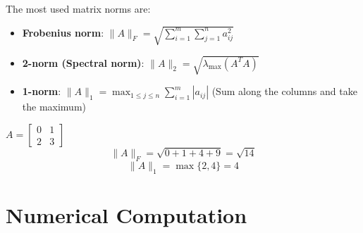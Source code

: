 \documentclass{article}
\begin{document}
The most used matrix norms are:
\begin{itemize}
    \item \textbf{Frobenius norm}: $\lVert
        A\rVert_F=\sqrt{\sum_{i=1}^{m}\sum_{j=1}^{n}a_{ij}^2}$
    \item \textbf{2-norm (Spectral norm)}: $\lVert A\rVert_2=\sqrt{\lambda_{\max}(A^TA)}$
    \item \textbf{1-norm}: $\lVert A\rVert_1=\max_{1\leq j\leq
        n}\sum_{i=1}^{m}\left\lvert a_{ij}\right\rvert$ (Sum along the columns
        and take the maximum)
\end{itemize}
\begin{example}
   $A=\begin{bmatrix}
       0 & 1 \\ 
       2 & 3
   \end{bmatrix}$ 
   $$\lVert A\rVert_F=\sqrt{0+1+4+9}=\sqrt{14}$$
   $$\lVert A\rVert_1=\max\{2,4\}=4$$
\end{example}
\cleardoublepage
\section{Numerical Computation}
\end{document}
